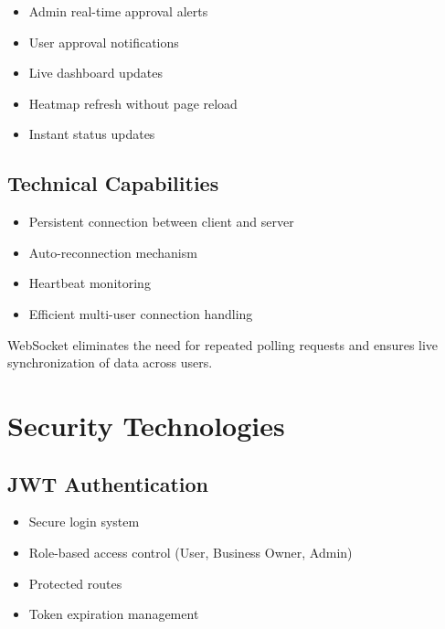 \documentclass[12pt,a4paper]{report}
\begin{document}
\begin{itemize}

\item Admin real-time approval alerts

\item User approval notifications

\item Live dashboard updates

\item Heatmap refresh without page reload

\item Instant status updates

\end{itemize}

\subsection*{Technical Capabilities}

\begin{itemize}

\item Persistent connection between client and server

\item Auto-reconnection mechanism

\item Heartbeat monitoring

\item Efficient multi-user connection handling

\end{itemize}

WebSocket eliminates the need for repeated polling requests and ensures live synchronization of data across users.

\section{Security Technologies}

\subsection*{JWT Authentication}

\begin{itemize}

\item Secure login system

\item Role-based access control (User, Business Owner, Admin)

\item Protected routes

\item Token expiration management

\end{itemize}
\end{document}
